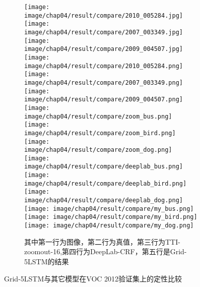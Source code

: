 {\begin{figure}
\begin{subfigure}{0.4\textwidth}
			\texttt{[image: image/chap04/result/compare/2010\_005284.jpg]}
			\texttt{[image: image/chap04/result/compare/2007\_003349.jpg]}
			\texttt{[image: image/chap04/result/compare/2009\_004507.jpg]}
			\\
			\texttt{[image: image/chap04/result/compare/2010\_005284.png]}
			\texttt{[image: image/chap04/result/compare/2007\_003349.png]}
			\texttt{[image: image/chap04/result/compare/2009\_004507.png]} \\
			\texttt{[image: image/chap04/result/compare/zoom\_bus.png]}
			\texttt{[image: image/chap04/result/compare/zoom\_bird.png]}
			\texttt{[image: image/chap04/result/compare/zoom\_dog.png]} \\
			\texttt{[image: image/chap04/result/compare/deeplab\_bus.png]}
			\texttt{[image: image/chap04/result/compare/deeplab\_bird.png]}
			\texttt{[image: image/chap04/result/compare/deeplab\_dog.png]} \\
			\texttt{[image: image/chap04/result/compare/my\_bus.png]}
			\texttt{[image: image/chap04/result/compare/my\_bird.png]}
			\texttt{[image: image/chap04/result/compare/my\_dog.png]}
			\caption{\tiny 其中第一行为图像，第二行为真值，第三行为TTI-zoomout-16,第四行为DeepLab-CRF，第五行是Grid-5LSTM的结果}
			\label{fig:compare2}
		\end{subfigure}
		\caption{Grid-5LSTM与其它模型在VOC 2012验证集上的定性比较}
	\end{figure}
}

